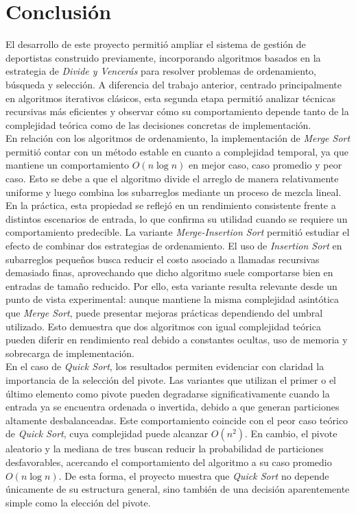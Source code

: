 \chapter{Conclusión}

El desarrollo de este proyecto permitió ampliar el sistema de gestión de deportistas construido previamente, incorporando algoritmos basados en la estrategia de \textit{Divide y Vencerás} para resolver problemas de ordenamiento, búsqueda y selección. A diferencia del trabajo anterior, centrado principalmente en algoritmos iterativos clásicos, esta segunda etapa permitió analizar técnicas recursivas más eficientes y observar cómo su comportamiento depende tanto de la complejidad teórica como de las decisiones concretas de implementación. \\

En relación con los algoritmos de ordenamiento, la implementación de \textit{Merge Sort} permitió contar con un método estable en cuanto a complejidad temporal, ya que mantiene un comportamiento $O(n \log n)$ en mejor caso, caso promedio y peor caso. Esto se debe a que el algoritmo divide el arreglo de manera relativamente uniforme y luego combina los subarreglos mediante un proceso de mezcla lineal. En la práctica, esta propiedad se reflejó en un rendimiento consistente frente a distintos escenarios de entrada, lo que confirma su utilidad cuando se requiere un comportamiento predecible. La variante \textit{Merge-Insertion Sort} permitió estudiar el efecto de combinar dos estrategias de ordenamiento. El uso de \textit{Insertion Sort} en subarreglos pequeños busca reducir el costo asociado a llamadas recursivas demasiado finas, aprovechando que dicho algoritmo suele comportarse bien en entradas de tamaño reducido. Por ello, esta variante resulta relevante desde un punto de vista experimental: aunque mantiene la misma complejidad asintótica que \textit{Merge Sort}, puede presentar mejoras prácticas dependiendo del umbral utilizado. Esto demuestra que dos algoritmos con igual complejidad teórica pueden diferir en rendimiento real debido a constantes ocultas, uso de memoria y sobrecarga de implementación. \\

En el caso de \textit{Quick Sort}, los resultados permiten evidenciar con claridad la importancia de la selección del pivote. Las variantes que utilizan el primer o el último elemento como pivote pueden degradarse significativamente cuando la entrada ya se encuentra ordenada o invertida, debido a que generan particiones altamente desbalanceadas. Este comportamiento coincide con el peor caso teórico de \textit{Quick Sort}, cuya complejidad puede alcanzar $O(n^2)$. En cambio, el pivote aleatorio y la mediana de tres buscan reducir la probabilidad de particiones desfavorables, acercando el comportamiento del algoritmo a su caso promedio $O(n \log n)$. De esta forma, el proyecto muestra que \textit{Quick Sort} no depende únicamente de su estructura general, sino también de una decisión aparentemente simple como la elección del pivote. \\

